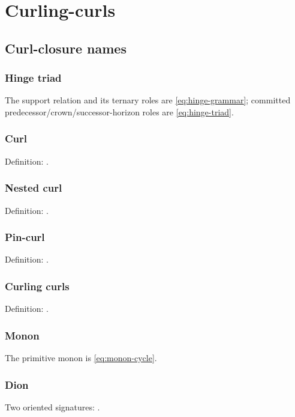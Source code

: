 \section{Curling-curls}
\label{app:curling-curls}

\subsection{Curl-closure names}
\label{app:cc-naming-conventions}

\subsubsection{Hinge triad}
\label{app:cc-hinge-triad}
The support relation and its ternary roles are \eqref{eq:hinge-grammar};
committed predecessor/crown/successor-horizon roles are \eqref{eq:hinge-triad}.

\subsubsection{Curl}
\label{app:cc-curl}
Definition: .

\subsubsection{Nested curl}
\label{app:cc-nested-curl}
Definition: .

\subsubsection{Pin-curl}
\label{app:cc-pin-curl}
Definition: .

\subsubsection{Curling curls}
\label{app:cc-curling-curls}
Definition: .

\subsubsection{Monon}
\label{app:cc-monon}
The primitive monon is \eqref{eq:monon-cycle}.

\subsubsection{Dion}
\label{app:cc-dion}
Two oriented signatures: .

